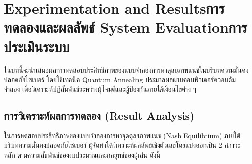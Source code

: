 \chapter{\ifproject%
\ifenglish Experimentation and Results\else การทดลองและผลลัพธ์\fi
\else%
\ifenglish System Evaluation\else การประเมินระบบ\fi
\fi}

\hspace{1.5em}ในบทนี้จะนำเสนอผลการทดสอบประสิทธิภาพของแบบจำลองการหาดุลยภาพแนชในบริบทความมั่นคงปลอดภัยไซเบอร์ โดยใช้เทคนิค Quantum Annealing ประมวลผลผ่านคอมพิวเตอร์ควอนตัมจำลอง เพื่อวิเคราะห์ปฏิสัมพันธ์ระหว่างผู้โจมตีและผู้ป้องกันภายใต้เงื่อนไขต่าง ๆ

\section{การวิเคราะห์ผลการทดลอง (Result Analysis)}
ในการทดสอบประสิทธิภาพของแบบจำลองการหาจุดดุลยภาพแนช (Nash Equilibrium) ภายใต้บริบทความมั่นคงปลอดภัยไซเบอร์ ผู้จัดทำได้วิเคราะห์ผลลัพธ์เชิงตัวเลขโดยแบ่งออกเป็น 2 สภาวะหลัก ตามความสัมพันธ์ของงบประมาณและกลยุทธ์ของผู้เล่น ดังนี้
